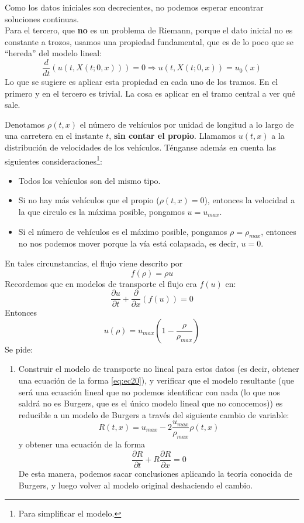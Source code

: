 \begin{ejercicio}
    Como los datos iniciales son decrecientes, no podemos esperar encontrar soluciones continuas. \\

    Para el tercero, que \textbf{no} es un problema de Riemann, porque el dato inicial no es constante a trozos, usamos una propiedad fundamental,
    que es de lo poco que se ``hereda'' del modelo lineal:
    $$\dfrac{d}{dt} (u(t,X(t;0,x))) = 0 \Longrightarrow u(t,X(t;0,x)) = u_0(x)$$
    Lo que se sugiere es aplicar esta propiedad en cada uno de los tramos. En el primero y en el tercero es trivial. La cosa es aplicar en el 
    tramo central a ver qué sale.
\end{ejercicio}

\begin{ejercicio}
    Denotamos $\rho(t,x)$ el número de vehículos por unidad de longitud a lo largo de una carretera en el instante $t$, \textbf{sin contar el propio}.
    Llamamos $u(t,x)$ a la distribución de velocidades de los vehículos. Ténganse además en cuenta las siguientes consideraciones\footnote{Para simplificar el modelo.}:
    \begin{itemize}
        \item Todos los vehículos son del mismo tipo.
        \item Si no hay más vehículos que el propio ($\rho(t,x) = 0$), entonces la velocidad a la que circulo es la máxima posible, pongamos $u = u_{max}$.
        \item Si el número de vehículos es el máximo posible, pongamos $\rho = \rho_{max}$, entonces no nos podemos mover porque la vía está colapsada,
        es decir, $u = 0$.
    \end{itemize}
    En tales circunstancias, el flujo viene descrito por 
    $$f(\rho) = \rho u$$
    Recordemos que en modelos de transporte el flujo era $f(u)$ en:
    \begin{equation}\label{eq:ec20}
        \dfrac{\partial u}{\partial t} + \dfrac{\partial}{\partial x} \left( f(u) \right) = 0
    \end{equation}
    Entonces 
    $$u(\rho) = u_{max} \left( 1 - \dfrac{\rho}{\rho_{max}} \right)$$
    Se pide:
    \begin{enumerate}
        \item Construir el modelo de transporte no lineal para estos datos (es decir, obtener una ecuación de la forma \eqref{eq:ec20}), y verificar que el modelo resultante
        (que será una ecuación lineal que no podemos identificar con nada (lo que nos saldrá no es Burgers, que es el único modelo lineal que no conocemos))
        es reducible a un modelo de Burgers a través del siguiente cambio de variable:
        \begin{equation}\label{eq:ec21}
            R(t,x) = u_{max} - 2 \dfrac{u_{max}}{\rho_{max}} \rho(t,x)
        \end{equation}
        y obtener una ecuación de la forma 
        $$\dfrac{\partial R}{\partial t} + R \dfrac{\partial R}{\partial x} = 0$$
        De esta manera, podemos sacar conclusiones aplicando la teoría conocida de Burgers, y luego volver al modelo original deshaciendo el cambio. \\


\end{enumerate}
\end{ejercicio}
